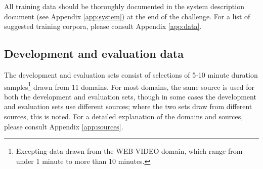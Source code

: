 \documentclass{article}
\begin{document}
All training data should be thoroughly documented in the system description document (see Appendix \ref{app:system}) at the end of the challenge. For a list of suggested training corpora, please consult Appendix \ref{app:data}. 


\subsection{Development and evaluation data}
\label{sec:singlechannel}
The development and evaluation sets consist of  selections of 5-10 minute duration samples\footnote{Excepting data drawn from the WEB VIDEO domain, which range from under 1 minute to more than 10 minutes.} drawn from 11 domains. For most domains, the same source is used for both the development and evaluation sets, though in some cases the development and evaluation sets use different sources; where the two sets draw from different sources, this is noted. For a detailed explanation of the domains and sources, please consult Appendix \ref{app:sources}.
\end{document}
